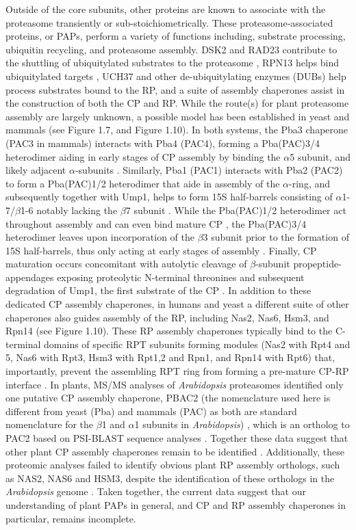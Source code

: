 Outside of the core subunits, other proteins are known to associate with the proteasome transiently or sub-stoichiometrically. These proteasome-associated proteins, or PAPs, perform a variety of functions including, substrate processing, ubiquitin recycling, and proteasome assembly. DSK2 and RAD23 contribute to the shuttling of ubiquitylated substrates to the proteasome \citep{farmer10, fatimababy10, lin11}, RPN13 helps bind ubiquitylated targets \citep{schreiner08}, UCH37 and other de-ubiquitylating enzymes (DUBs) \citep{vanderlinden15} help process substrates bound to the RP, and a suite of assembly chaperones assist in the construction of both the CP and RP.  While the route(s) for plant proteasome assembly are largely unknown, a possible model has been established in yeast and mammals (see Figure 1.7, and Figure 1.10). In both systems, the Pba3 chaperone (PAC3 in mammals) interacts with Pba4 (PAC4), forming a Pba(PAC)3/4 heterodimer aiding in early stages of CP assembly by binding the $\alpha$5 subunit, and likely adjacent $\alpha$-subunits  \citep{kunjappu14, yashiroda08}. Similarly, Pba1 (PAC1) interacts with Pba2 (PAC2) to form a Pba(PAC)1/2 heterodimer that aide in assembly of the $\alpha$-ring, and subsequently together with Ump1, helps to form 15S half-barrels consisting of $\alpha$1-7/$\beta$1-6 notably lacking the $\beta$7 subunit \citep{kunjappu14, marques07}. While the Pba(PAC)1/2 heterodimer act throughout assembly and can even bind mature CP \citep{stadtmueller12}, the Pba(PAC)3/4 heterodimer leaves upon incorporation of the $\beta$3 subunit prior to the formation of 15S half-barrels, thus only acting at early stages of assembly \citep{hirano08}. Finally, CP maturation occurs concomitant with autolytic cleavage of $\beta$-subunit propeptide-appendages exposing proteolytic N-terminal threonines and subsequent degradation of Ump1, the first substrate of the CP \citep{ramos98}. In addition to these dedicated CP assembly chaperones, in humans and yeast a different suite of other chaperones also guides assembly of the RP, including Nas2, Nas6, Hsm3, and Rpn14 (see Figure 1.10). These RP assembly chaperones typically bind to the C-terminal domains of specific RPT subunits forming modules (Nas2 with Rpt4 and 5, Nas6 with Rpt3, Hsm3 with Rpt1,2 and Rpn1, and Rpn14 with Rpt6) that, importantly, prevent the assembling RPT ring from forming a pre-mature CP-RP interface \citep{park10}.  In plants, MS/MS analyses of \textit{Arabidopsis} proteasomes identified only one putative CP assembly chaperone, PBAC2 (the nomenclature used here is different from yeast (Pba) and mammals (PAC) as both are standard nomenclature for the $\beta$1 and $\alpha$1 subunits in \textit{Arabidopsis}) \citep{book10}, which is an ortholog to PAC2 based on PSI-BLAST sequence analyses \citep{kusmierczyk11, le07}. Together these data suggest that other plant CP assembly chaperones remain to be identified \citep{book10}.  Additionally, these proteomic analyses failed to identify obvious plant RP assembly orthologs, such as NAS2, NAS6 and HSM3, despite the identification of these orthologs in the \textit{Arabidopsis} genome \citep{book10}. Taken together, the current data suggest that our understanding of plant PAPs in general, and CP and RP assembly chaperones in particular, remains incomplete.

